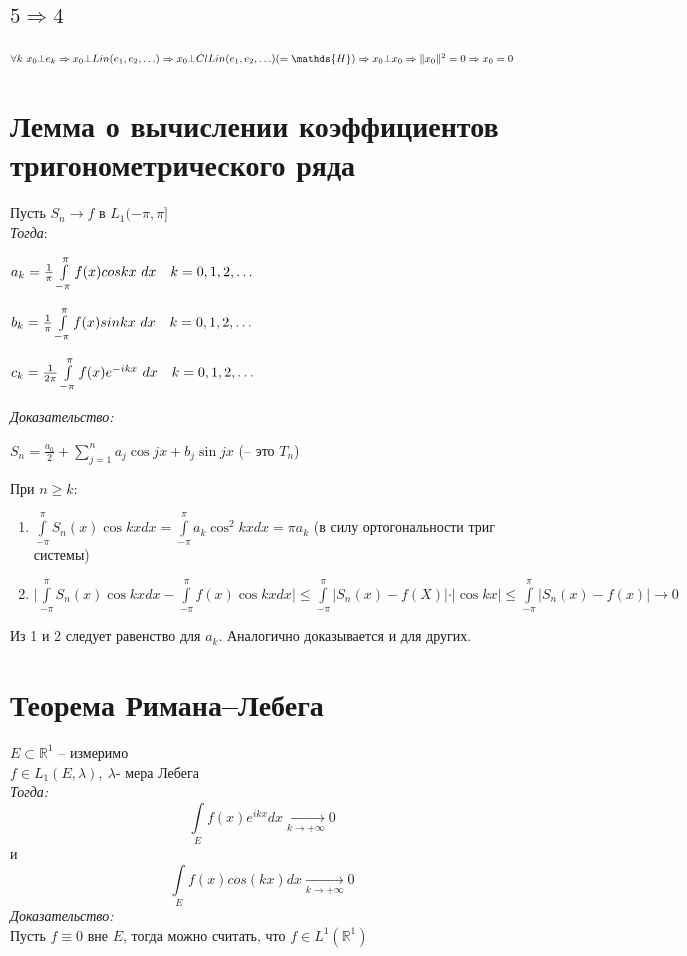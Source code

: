\documentclass[paper=a4, fontsize=17pt]{article}
\begin{document}
\subsection{\texorpdfstring{$5 \Rightarrow 4$}{TEXT}}
$\forall k \ x_0 \bot e_k \Rightarrow x_0 \bot Lin(e_1, e_2, \mathellipsis) \Rightarrow x_0 \bot Cl Lin(e_1, e_2, \mathellipsis)( = \mathds{H}) \Rightarrow x_0 \bot x_0 \Rightarrow \|x_0\|^2 = 0 \Rightarrow x_0 = 0$

\section{Лемма о вычислении коэффициентов тригонометрического ряда}

Пусть $S_n \rightarrow f$ в $L_1(-\pi, \pi]$\\

\emph{Тогда}:

$a_k = \frac{1}{\pi}\int\limits_{-\pi}^{\pi}f(x)coskx\ dx \quad k = 0, 1, 2, \mathellipsis$

$b_k = \frac{1}{\pi}\int\limits_{-\pi}^{\pi}f(x)sinkx\ dx \quad k = 0, 1, 2, \mathellipsis$

$c_k = \frac{1}{2\pi}\int\limits_{-\pi}^{\pi}f(x)e^{-ikx}\ dx \quad k = 0, 1, 2, \mathellipsis$


\emph{Доказательство:}

$S_n=\frac{a_0}2 + \sum\limits_{j=1}^n a_j \cos jx + b_j \sin jx$ (-- это $T_n$)

При $n \ge k:$

\begin{enumerate}
	\item
		$\int\limits_{-\pi}^{\pi} S_n(x) \cos kx dx = \int\limits_{-\pi}^{\pi} a_k \cos^2 kx dx = \pi a_k$
		(в силу ортогональности триг системы)
	\item
		$\vert \int\limits_{-\pi}^{\pi} S_n(x) \cos kx dx - \int\limits_{-\pi}^{\pi} f(x) \cos kx dx \vert \le \int\limits_{-\pi}^{\pi} \vert S_n(x)-f(X) \vert \cdot \vert \cos kx \vert \le \int\limits_{-\pi}^{\pi} \vert S_n(x) - f(x) \vert \rightarrow 0$
\end{enumerate}

Из 1 и 2 следует равенство для $a_k$. Аналогично доказывается и для других.

\section{Теорема Римана--Лебега}
$E \subset \mathds{R}^1$ -- измеримо\\ $f \in L_1(E, \lambda), ~ \lambda \text{- мера Лебега}$ \\
\emph{Тогда:} $$\int\limits_{E}f(x)e^{ikx}dx \xrightarrow[k \to +\infty]{} 0$$ и $$\int\limits_{E}f(x)cos(kx)dx \xrightarrow[k \to +\infty]{} 0$$
\emph{Доказательство:} \\
Пусть $f \equiv 0$ вне $E$, тогда можно считать, что $f \in L^1(\mathds{R}^1)$
\end{document}

